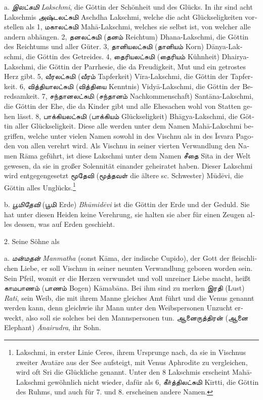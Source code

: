 \documentclass{article}
\newcommand{\TamilText}[1]{\texttamil{#1}}
\newcommand{\TamilItalic}[1]{\texttamil{\emph{#1}}}
\newcommand{\tam}[1]{\TamilText{#1}}
\newcommand{\tamitalic}[1]{\TamilItalic{#1}}
\begin{document}
{\textgerman{a}. \tamitalic{இலட்சுமி} \textgerman{\emph{Lakschmi}, die Göttin der Schönheit und des Glücks. In ihr sind acht Lakschmis \tam{அஷ்டலட்சுமி} Aschdha Lakschmi, welche die acht Glückseligkeiten vorstellen als 1, \tam{மகாலட்சுமி} Mah\={a}-Lakschmi, welches sie selbst ist, von welcher alle andern abhängen. 2, \tam{தனலட்சுமி} (\tam{தனம்} Reichtum) Dhana-Lakschmi, die Göttin des Reichtums und aller Güter. 3, \tam{தானியலட்சுமி} (\tam{தானியம்} Korn) D\={a}nya-Lakschmi, die Göttin des Getreides. 4, \tam{தைரியலட்சுமி} (\tam{தைரியம்} Kühnheit) Dhairya-Lakschmi, die Göttin der Parrhesie, die da Freudigkeit, Mut und ein getrostes Herz gibt. 5, \tam{வீரலட்சுமி} (\tam{வீரம்} Tapferkeit) V\={i}ra-Lakschmi, die Göttin der Tapferkeit. 6, \tam{வித்தியாலட்சுமி} (\tam{வித்தியை} Kenntnis) Vidy\={a}-Lakschmi, die Göttin der Beredsamkeit. 7, \tam{சந்தானலட்சுமி} (\tam{சந்தானம்} Nachkommenschaft) Sant\={a}na-Lakschmi, die Göttin der Ehe, die da Kinder gibt und alle Ehesachen wohl von Statten gehen lässt. 8, \tam{பாக்கியலட்சுமி} (\tam{பாக்கியம்} Glückseligkeit) Bh\={a}gya-Lakschmi, die Göttin aller Glückseligkeit. Diese alle werden unter dem Namen Mah\={a}-Lakschmi begriffen, welche unter vielen Namen sowohl in des Vischnu als in des \={I}svara Pagoden von allen verehrt wird. Als Vischnu in seiner vierten Verwandlung den Namen R\={a}ma geführt, ist diese Lakschmi unter dem Namen \tam{சீதை} S\={i}ta in der Welt gewesen, da sie in großer Solennität einander geheiratet haben. Dieser Lakschmi wird entgegengesetzt \tam{மூதேவி} (\tam{மூத்தவள்} die ältere sc. Schwester) M\={u}d\={e}vi, die Göttin alles Unglücks.\footnote{Lakschmi, in erster Linie Ceres, ihrem Ursprunge nach, da sie in Vischnus zweiter Avat\={a}re aus der See aufsteigt, mit Venus Aphrodite zu vergleichen, wird oft Sri die Glückliche genannt. Unter den 8 Lakschmis erscheint Mah\={a}-Lakschmi gewöhnlich nicht wieder, dafür als 6, \tam{கீா்த்திலட்சுமி} K\={i}rtti, die Göttin des Ruhms, und auch für 7. und 8. erscheinen andere Namen.}}

\textgerman{b}. \tamitalic{பூமிதேவி} (\tam{பூமி} \textgerman{Erde) \emph{Bh\={u}mid\={e}vi} ist die Göttin der Erde und der Geduld. Sie hat unter diesen Heiden keine Verehrung, sie halten sie aber für einen Zeugen alles dessen, was auf Erden geschieht.}

\bigskip

2. \textgerman{Seine Söhne als}

\bigskip

\textgerman{a}. \tamitalic{மன்மதன்} \emph{\textgerman{Manmatha}} (\textgerman{sonst K\={a}ma, der indische Cupido), der Gott der fleischlichen Liebe, er soll Vischnu in seiner neunten Verwandlung geboren worden sein. Sein Pfeil, womit er die Herzen verwundet und voll unreiner Liebe macht, heißt \tam{காமபாணம்} (\tam{பாணம்} Bogen) K\={a}mab\={a}na. Bei ihm sind zu merken \tam{இரதி} (Lust) \emph{Rati}, sein Weib, die mit ihrem Manne gleiches Amt führt und die Venus genannt werden kann, denn gleichwie ihr Mann unter den Weibspersonen Unzucht erweckt, also soll sie solches bei den Mannspersonen tun. \tam{ஆனைருத்திரன்} (\tam{ஆனை} Elephant) \emph{\={A}nairudra}, ihr Sohn.}

}
\end{document}
